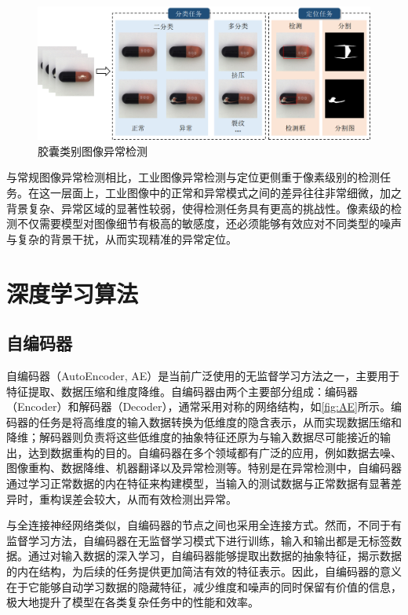 \documentclass[lang=chs, degree=master, blindreview=false, adobe=false]{yanputhesis}
\begin{document}
\begin{figure}[htb]
	\centering
	\includegraphics[width=1\linewidth]{figs/胶囊类别异常检测示例.png}
	\caption{胶囊类别图像异常检测}
	\label{fig:Example of capsule}
\end{figure}

与常规图像异常检测相比，工业图像异常检测与定位更侧重于像素级别的检测任务。在这一层面上，工业图像中的正常和异常模式之间的差异往往非常细微，加之背景复杂、异常区域的显著性较弱，使得检测任务具有更高的挑战性。像素级的检测不仅需要模型对图像细节有极高的敏感度，还必须能够有效应对不同类型的噪声与复杂的背景干扰，从而实现精准的异常定位。

\section{深度学习算法}

\subsection{自编码器}

自编码器（AutoEncoder, AE）是当前广泛使用的无监督学习方法之一，主要用于特征提取、数据压缩和维度降维。自编码器由两个主要部分组成：编码器（Encoder）和解码器（Decoder），通常采用对称的网络结构，如\autoref{fig:AE}所示。编码器的任务是将高维度的输入数据转换为低维度的隐含表示，从而实现数据压缩和降维；解码器则负责将这些低维度的抽象特征还原为与输入数据尽可能接近的输出，达到数据重构的目的。自编码器在多个领域都有广泛的应用，例如数据去噪、图像重构、数据降维、机器翻译以及异常检测等。特别是在异常检测中，自编码器通过学习正常数据的内在特征来构建模型，当输入的测试数据与正常数据有显著差异时，重构误差会较大，从而有效检测出异常。

与全连接神经网络类似，自编码器的节点之间也采用全连接方式。然而，不同于有监督学习方法，自编码器在无监督学习模式下进行训练，输入和输出都是无标签数据。通过对输入数据的深入学习，自编码器能够提取出数据的抽象特征，揭示数据的内在结构，为后续的任务提供更加简洁有效的特征表示。因此，自编码器的意义在于它能够自动学习数据的隐藏特征，减少维度和噪声的同时保留有价值的信息，极大地提升了模型在各类复杂任务中的性能和效率。
\end{document}
